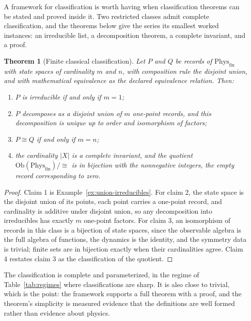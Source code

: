 \documentclass[11pt,letterpaper]{article}
\newtheorem{theorem}{Theorem}[section]
\theoremstyle{definition}
\theoremstyle{remark}
\begin{document}
A framework for classification is worth having when classification theorems can be stated and proved inside it. Two restricted classes admit complete classification, and the theorems below give the series its smallest worked instances: an irreducible list, a decomposition theorem, a complete invariant, and a proof.

\begin{theorem}[Finite classical classification]
\label{thm:finite-state-classification}
Let $P$ and $Q$ be records of $\mathrm{Phys}_{\mathrm{fin}}$ with state spaces of cardinality $m$ and $n$, with composition rule the disjoint union, and with mathematical equivalence as the declared equivalence relation. Then:
\begin{enumerate}
\item $P$ is irreducible if and only if $m = 1$;
\item $P$ decomposes as a disjoint union of $m$ one-point records, and this decomposition is unique up to order and isomorphism of factors;
\item $P \cong Q$ if and only if $m = n$;
\item the cardinality $|X|$ is a complete invariant, and the quotient $\mathrm{Ob}(\mathrm{Phys}_{\mathrm{fin}})/\cong$ is in bijection with the nonnegative integers, the empty record corresponding to zero.
\end{enumerate}
\end{theorem}

\begin{proof}
Claim 1 is Example~\ref{ex:union-irreducibles}. For claim 2, the state space is the disjoint union of its points, each point carries a one-point record, and cardinality is additive under disjoint union, so any decomposition into irreducibles has exactly $m$ one-point factors. For claim 3, an isomorphism of records in this class is a bijection of state spaces, since the observable algebra is the full algebra of functions, the dynamics is the identity, and the symmetry data is trivial; finite sets are in bijection exactly when their cardinalities agree. Claim 4 restates claim 3 as the classification of the quotient.
\end{proof}

The classification is complete and parameterized, in the regime of Table~\ref{tab:regimes} where classifications are sharp. It is also close to trivial, which is the point: the framework supports a full theorem with a proof, and the theorem's simplicity is measured evidence that the definitions are well formed rather than evidence about physics.
\end{document}
